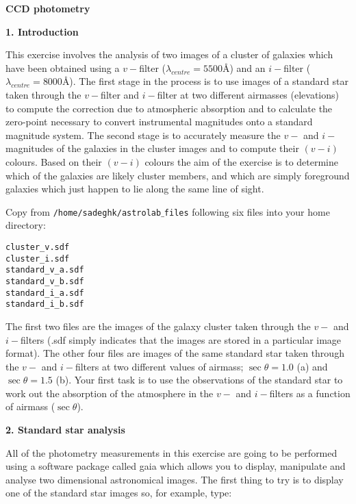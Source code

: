 \pagestyle{myheadings}
\setcounter{page}{1}

\begin{center}
{\Huge\bf CCD photometry}
\end{center}

{\bf \large{1. Introduction}}

This exercise involves the analysis of two images of a cluster of galaxies which have been obtained using a $v-$filter ($\lambda_{centre}=5500$\AA) and an $i-$filter ($\lambda_{centre}=8000$\AA). The first stage in the process is to use images of a standard star taken through the $v-$filter and $i-$filter at two different airmasses (elevations) to compute the correction due to atmospheric absorption and to calculate the zero-point necessary to convert instrumental magnitudes onto a standard magnitude system. The second stage is to accurately measure the $v-$ and $i-$magnitudes of the galaxies in the cluster images and to compute their $(v-i)$ colours. Based on their $(v-i)$ colours the aim of the exercise is to determine which of the galaxies are likely cluster members, and which are simply foreground galaxies which just happen to lie along the same line of sight.

\noindent
Copy from {\tt /home/sadeghk/astrolab$\_$files}  following six files into your home directory:

\verb,cluster_v.sdf,\\
\verb,cluster_i.sdf,\\
\verb,standard_v_a.sdf,\\
\verb,standard_v_b.sdf,\\
\verb,standard_i_a.sdf,\\
\verb,standard_i_b.sdf,

The first two files are the images of the galaxy cluster taken through the $v-$ and $i-$filters (.sdf simply indicates that the images are stored in a particular image format). The other four files are images of the same standard star taken through the $v-$ and $i-$filters at two different values of airmass; $\sec \theta=1.0$ (a) and $\sec \theta=1.5$ (b). Your first task is to use the observations of the standard star to work out the absorption of the atmosphere in the $v-$ and $i-$filters as a function of airmass ($\sec \theta$).

{\bf \large{2. Standard star analysis}}

All of the photometry measurements in this exercise are going to be performed using a software package called {\sc gaia} which allows you to display, manipulate and analyse two dimensional astronomical images. The first thing to try is to display one of the standard star images so, for example, type:

